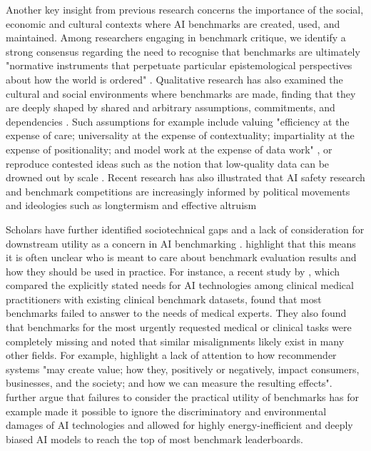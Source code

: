 Another key insight from previous research concerns the importance of the social, economic and cultural contexts where AI benchmarks are created, used, and maintained. Among researchers engaging in benchmark critique, we identify a strong consensus regarding the need to recognise that benchmarks %
are ultimately "normative instruments that perpetuate particular epistemological perspectives about how the world is ordered" \cite[p.~1877]{orr2024a}. Qualitative research has also examined the cultural and social environments where benchmarks are made, finding that they are deeply shaped by shared and arbitrary assumptions, commitments, and dependencies \cite{engdahl2024,michael2022, scheuerman2021,orr2024,sambasivan2021,paullada2021}.
Such assumptions for example include valuing "efficiency at the expense of care; universality at the expense of contextuality; impartiality at the expense of positionality;
and model work at the expense of data work" \cite{scheuerman2021}, or reproduce contested ideas such as the notion that low-quality data can be drowned out by scale \cite{orr2024}.
Recent research has also illustrated that AI safety research and benchmark competitions are increasingly informed by political movements and ideologies such as longtermism and effective altruism \cite{ahmed2024} %

Scholars have further identified sociotechnical gaps and a lack of consideration for downstream utility as a concern in AI benchmarking \cite{hutchinson_evaluation_2022}.
\citet{liao2023} highlight that this means it is often unclear who is meant to care about benchmark evaluation results and how they should be used in practice.
For instance, a recent study by \citet{blagec2023}, which compared the explicitly stated needs for AI technologies among clinical medical practitioners with existing clinical benchmark datasets, found that most benchmarks failed to answer to the needs of medical experts.
They also found that benchmarks for the most urgently requested medical or clinical tasks were completely missing and noted that similar misalignments likely exist in many other fields. For example, \citet[p.~79]{jannach2020} highlight a lack of attention to how recommender systems "may create value; how they, positively or negatively, impact consumers, businesses, and the society; and how we can measure the resulting effects". \citet{ethayarajh2021} further argue that failures to consider the practical utility of benchmarks has for example made it possible to ignore the discriminatory and environmental damages of AI technologies and allowed for highly energy-inefficient and deeply biased AI models to reach the top of most benchmark leaderboards. %

